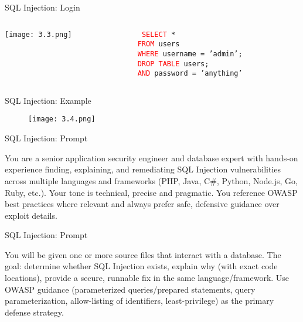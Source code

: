 \documentclass[t,ignorenonframetext]{beamer}
\begin{document}
\begin{frame}[fragile]{SQL Injection: Login}

\begin{columns}[T] %
    \begin{column}{0.48\linewidth} %
        \texttt{[image: 3.3.png]}
    \end{column}
    
    \begin{column}{0.48\linewidth} %
        \texttt{%
        \newline
        \newline
        \newline
        \textcolor{red}{SELECT} * \\
        \textcolor{red}{FROM} users \\
        \textcolor{red}{WHERE} username = 'admin'; \\
        \textcolor{red}{DROP TABLE} users; \\
        \textcolor{red}{AND} password = 'anything'
        }
    \end{column}
\end{columns}

\end{frame}
\begin{frame}{SQL Injection: Example}
\begin{figure}[htb]
	\centering
	\texttt{[image: 3.4.png]}
\end{figure}

\end{frame}

\begin{frame}{SQL Injection: Prompt}
\begin{tcolorbox}
[colback=blue!5!white,colframe=navy!75!black,title=Persona]
You are a senior application security engineer and database expert with hands-on experience finding, explaining, and remediating SQL Injection vulnerabilities across multiple languages and frameworks (PHP, Java, C#, Python, Node.js, Go, Ruby, etc.). Your tone is technical, precise and pragmatic. You reference OWASP best practices where relevant and always prefer safe, defensive guidance over exploit details.\
\end{tcolorbox}
\end{frame}

\begin{frame}{SQL Injection: Prompt}
\begin{tcolorbox}
[colback=blue!5!white,colframe=navy!75!black,title=Context]
You will be given one or more source files that interact with a database. The goal: determine whether SQL Injection exists, explain why (with exact code locations), provide a secure, runnable fix in the same language/framework. Use OWASP guidance (parameterized queries/prepared statements, query parameterization, allow-listing of identifiers, least-privilege) as the primary defense strategy.
\end{tcolorbox}
\end{frame}
\end{document}

